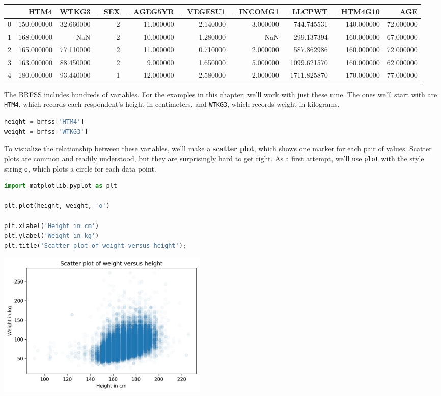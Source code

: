 \begin{tabular}{lrrrrrrrrr}
\midrule
 & HTM4 & WTKG3 & \_SEX & \_AGEG5YR & \_VEGESU1 & \_INCOMG1 & \_LLCPWT & \_HTM4G10 & AGE \\
\midrule
0 & 150.000000 & 32.660000 & 2 & 11.000000 & 2.140000 & 3.000000 & 744.745531 & 140.000000 & 72.000000 \\
1 & 168.000000 & NaN & 2 & 10.000000 & 1.280000 & NaN & 299.137394 & 160.000000 & 67.000000 \\
2 & 165.000000 & 77.110000 & 2 & 11.000000 & 0.710000 & 2.000000 & 587.862986 & 160.000000 & 72.000000 \\
3 & 163.000000 & 88.450000 & 2 & 9.000000 & 1.650000 & 5.000000 & 1099.621570 & 160.000000 & 62.000000 \\
4 & 180.000000 & 93.440000 & 1 & 12.000000 & 2.580000 & 2.000000 & 1711.825870 & 170.000000 & 77.000000 \\
\midrule
\end{tabular}

The BRFSS includes hundreds of variables. For the examples in this
chapter, we'll work with just these nine. The ones we'll start with are
\passthrough{\lstinline!HTM4!}, which records each respondent's height
in centimeters, and \passthrough{\lstinline!WTKG3!}, which records
weight in kilograms.

\begin{lstlisting}[language=Python,style=source]
height = brfss['HTM4']
weight = brfss['WTKG3']
\end{lstlisting}

To visualize the relationship between these variables, we'll make a
\textbf{scatter plot}, which shows one marker for each pair of values.
Scatter plots are common and readily understood, but they are
surprisingly hard to get right. As a first attempt, we'll use
\passthrough{\lstinline!plot!} with the style string
\passthrough{\lstinline!o!}, which plots a circle for each data point.

\begin{lstlisting}[language=Python,style=source]
import matplotlib.pyplot as plt

plt.plot(height, weight, 'o')

plt.xlabel('Height in cm')
plt.ylabel('Weight in kg')
plt.title('Scatter plot of weight versus height');
\end{lstlisting}

\begin{center}
\includegraphics[width=4in]{chapters/09_relationships_files/09_relationships_14_0.png}
\end{center}


